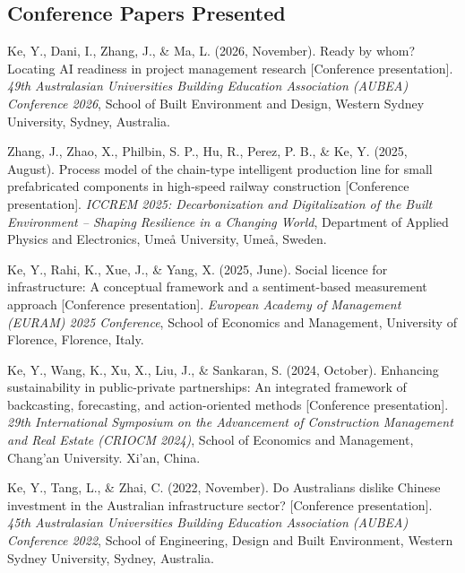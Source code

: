 \documentclass[11pt,a4paper]{report} %
\begin{document}
    \subsection*{Conference Papers Presented}

    \begin{tablist}

        \item[2026] \tab{}Ke, Y., Dani, I., Zhang, J., \& Ma, L. (2026, November). Ready by whom? Locating AI readiness in project management research [Conference presentation]. \textit{49th Australasian Universities Building Education Association (AUBEA) Conference 2026}, School of Built Environment and Design, Western Sydney University, Sydney, Australia.
    
        \item[2025] \tab{}Zhang, J., Zhao, X., Philbin, S. P., Hu, R., Perez, P. B., \& Ke, Y. (2025, August). Process model of the chain-type intelligent production line for small prefabricated components in high-speed railway construction [Conference presentation]. \textit{ICCREM 2025: Decarbonization and Digitalization of the Built Environment -- Shaping Resilience in a Changing World}, Department of Applied Physics and Electronics, Umeå University, Umeå, Sweden.
        
        \item[2025] \tab{}Ke, Y., Rahi, K., Xue, J., \& Yang, X. (2025, June). Social licence for infrastructure: A conceptual framework and a sentiment-based measurement approach [Conference presentation]. \textit{European Academy of Management (EURAM) 2025 Conference}, School of Economics and Management, University of Florence, Florence, Italy.
        
        \item[2024] \tab{}Ke, Y., Wang, K., Xu, X., Liu, J., \& Sankaran, S. (2024, October). Enhancing sustainability in public-private partnerships: An integrated framework of backcasting, forecasting, and action-oriented methods [Conference presentation]. \textit{29th International Symposium on the Advancement of Construction Management and Real Estate (CRIOCM 2024)}, School of Economics and Management, Chang'an University. Xi'an, China.
        
        \item[2022] \tab{}Ke, Y., Tang, L., \& Zhai, C. (2022, November). Do Australians dislike Chinese investment in the Australian infrastructure sector? [Conference presentation]. \textit{45th Australasian Universities Building Education Association (AUBEA) Conference 2022}, School of Engineering, Design and Built Environment, Western Sydney University, Sydney, Australia.
        

\end{tablist}
\end{document}
